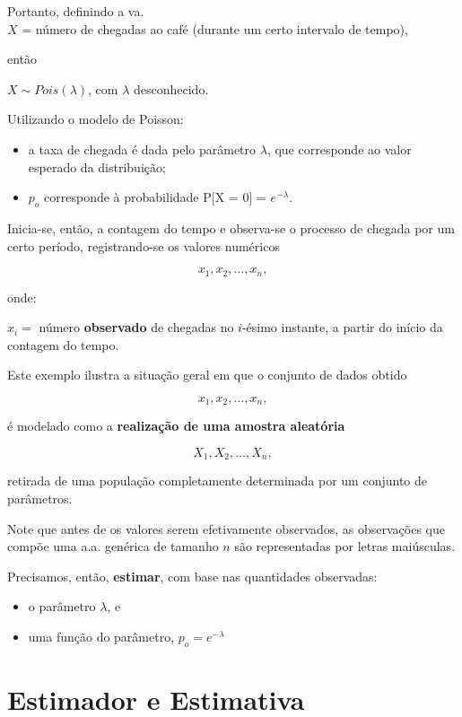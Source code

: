 \documentclass[
]{book}
\providecommand{\tightlist}{%
  \setlength{\itemsep}{0pt}\setlength{\parskip}{0pt}}
\theoremstyle{definition}
\theoremstyle{definition}
\theoremstyle{definition}
\theoremstyle{remark}
\begin{document}
Portanto, definindo a va.\\
\(X\) = número de chegadas ao café (durante um certo intervalo de tempo),

então

\(X \sim Pois( \lambda )\), com \(\lambda\) desconhecido.

Utilizando o modelo de Poisson:

\begin{itemize}
\tightlist
\item
  a taxa de chegada é dada pelo parâmetro \(\lambda\), que corresponde ao valor esperado da distribuição;\\
\item
  \(p_o\) corresponde à probabilidade P{[}X = 0{]} = \(e^{-\lambda}\).
\end{itemize}

Inicia-se, então, a contagem do tempo e observa-se o processo de chegada por um certo período, registrando-se os valores numéricos

\[x_1, x_2, \ldots, x_n,\]

onde:

\(x_i=\) número \textbf{observado} de chegadas no \(i\)-ésimo instante, a partir do início da contagem do tempo.

Este exemplo ilustra a situação geral em que o conjunto de dados obtido

\[x_1, x_2, \ldots, x_n,\]

é modelado como a \textbf{realização de uma amostra aleatória}

\[X_1, X_2, \ldots, X_n,\]

retirada de uma população completamente determinada por um conjunto de parâmetros.

Note que antes de os valores serem efetivamente observados, as observações que compõe uma a.a. genérica de tamanho \(n\) são representadas por letras maiúsculas.

Precisamos, então, \textbf{estimar}, com base nas quantidades observadas:

\begin{itemize}
\tightlist
\item
  o parâmetro \(\lambda\), e\\
\item
  uma função do parâmetro, \(p_o = e^{-\lambda}\)
\end{itemize}

\hypertarget{estimador-e-estimativa}{%
\section{Estimador e Estimativa}\label{estimador-e-estimativa}}
\end{document}
